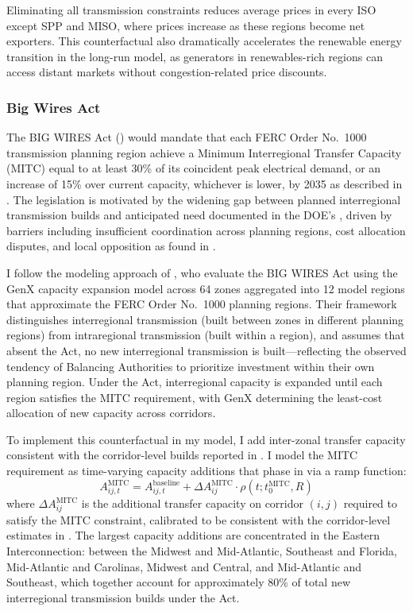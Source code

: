 \documentclass[12pt]{article}
\begin{document}
Eliminating all transmission constraints reduces average prices in every ISO except SPP and MISO, where prices increase as these regions become net exporters. This counterfactual also dramatically accelerates the renewable energy transition in the long-run model, as generators in renewables-rich regions can access distant markets without congestion-related price discounts.

\subsubsection{Big Wires Act}

The BIG WIRES Act (\cite{big_wires_act_2023}) would mandate that each FERC Order No.\ 1000 transmission planning region achieve a Minimum Interregional Transfer Capacity (MITC) equal to at least 30\% of its coincident peak electrical demand, or an increase of 15\% over current capacity, whichever is lower, by 2035 as described in \cite{hickenlooper2023s}. The legislation is motivated by the widening gap between planned interregional transmission builds and anticipated need documented in the DOE's \cite{DOENationalTransmissionNeedsStudy}, driven by barriers including insufficient coordination across planning regions, cost allocation disputes, and local opposition as found in \cite{joskow2021facilitating, pfeifenberger2021transmission}.

I follow the modeling approach of \cite{botterud2024evaluating}, who evaluate the BIG WIRES Act using the GenX capacity expansion model across 64 zones aggregated into 12 model regions that approximate the FERC Order No.\ 1000 planning regions. Their framework distinguishes interregional transmission (built between zones in different planning regions) from intraregional transmission (built within a region), and assumes that absent the Act, no new interregional transmission is built---reflecting the observed tendency of Balancing Authorities to prioritize investment within their own planning region. Under the Act, interregional capacity is expanded until each region satisfies the MITC requirement, with GenX determining the least-cost allocation of new capacity across corridors.

To implement this counterfactual in my model, I add inter-zonal transfer capacity consistent with the corridor-level builds reported in \cite{botterud2024evaluating}. I model the MITC requirement as time-varying capacity additions that phase in via a ramp function:
\begin{equation}
    A_{ij,t}^{\text{MITC}} = A_{ij,t}^{\text{baseline}} + \Delta A^{\text{MITC}}_{ij} \cdot \rho(t; t_0^{\text{MITC}}, R)
\end{equation}
where $\Delta A^{\text{MITC}}_{ij}$ is the additional transfer capacity on corridor $(i,j)$ required to satisfy the MITC constraint, calibrated to be consistent with the corridor-level estimates in \cite{botterud2024evaluating}. The largest capacity additions are concentrated in the Eastern Interconnection: between the Midwest and Mid-Atlantic, Southeast and Florida, Mid-Atlantic and Carolinas, Midwest and Central, and Mid-Atlantic and Southeast, which together account for approximately 80\% of total new interregional transmission builds under the Act.
\end{document}
